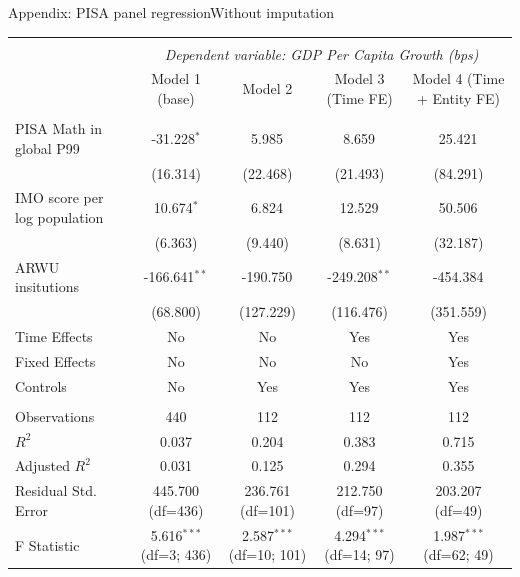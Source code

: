 \documentclass[10pt]{beamer}
\begin{document}
\begin{frame}{Appendix: PISA panel regression}{Without imputation}
    \begin{table}[!htbp] \centering
        \resizebox{\linewidth}{!} {
            \begin{tabular}{@{\extracolsep{5pt}}lcccc}
                \\[-1.8ex]\hline
                \hline \\[-1.8ex]
                & \multicolumn{4}{c}{\textit{Dependent variable: GDP Per Capita Growth (bps)}} \
                \cr \cline{2-5}
                \\[-1.8ex] & \multicolumn{1}{c}{Model 1 (base)} & \multicolumn{1}{c}{Model 2} & \multicolumn{1}{c}{Model 3 (Time FE)} & \multicolumn{1}{c}{Model 4 (Time + Entity FE)}  \\
                \hline \\[-1.8ex]
                 PISA Math in global P99 & -31.228$^{*}$ & 5.985$^{}$ & 8.659$^{}$ & 25.421$^{}$ \\
                & (16.314) & (22.468) & (21.493) & (84.291) \\
                 IMO score per log population & 10.674$^{*}$ & 6.824$^{}$ & 12.529$^{}$ & 50.506$^{}$ \\
                & (6.363) & (9.440) & (8.631) & (32.187) \\
                 ARWU insitutions & -166.641$^{**}$ & -190.750$^{}$ & -249.208$^{**}$ & -454.384$^{}$ \\
                & (68.800) & (127.229) & (116.476) & (351.559) \\
                 Time Effects & No & No & Yes & Yes \\
                 Fixed Effects & No & No & No & Yes \\
                 Controls & No & Yes & Yes & Yes \\
                \hline \\[-1.8ex]
                 Observations & 440 & 112 & 112 & 112 \\
                 $R^2$ & 0.037 & 0.204 & 0.383 & 0.715 \\
                 Adjusted $R^2$ & 0.031 & 0.125 & 0.294 & 0.355 \\
                 Residual Std. Error & 445.700 (df=436) & 236.761 (df=101) & 212.750 (df=97) & 203.207 (df=49) \\
                 F Statistic & 5.616$^{***}$ (df=3; 436) & 2.587$^{***}$ (df=10; 101) & 4.294$^{***}$ (df=14; 97) & 1.987$^{***}$ (df=62; 49) \\

\end{tabular}}
\end{table}
\end{frame}
\end{document}
